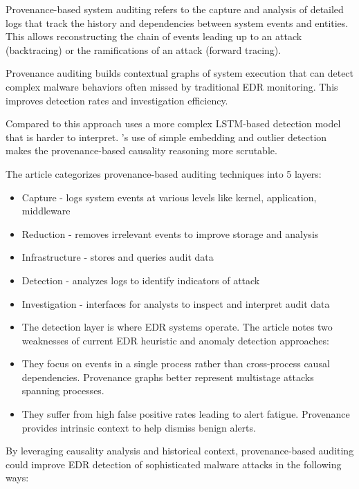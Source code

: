 \documentclass{article}
\begin{document}
Provenance-based system auditing refers to the capture and analysis of detailed logs that track the history and dependencies between system events and entities. This allows reconstructing the chain of events leading up to an attack (backtracing) or the ramifications of an attack (forward tracing).

Provenance auditing builds contextual graphs of system execution that can detect complex malware behaviors often missed by traditional EDR monitoring. This improves detection rates and investigation efficiency.

Compared to \autocite{Wang:2020} this approach uses a more complex LSTM-based detection model that is harder to interpret. \textcite{Wang:2020}'s use of simple embedding and outlier detection makes the provenance-based causality reasoning more scrutable.


The article categorizes provenance-based auditing techniques into 5 layers:

\begin{itemize}
\item Capture - logs system events at various levels like kernel, application, middleware
\item Reduction - removes irrelevant events to improve storage and analysis
\item Infrastructure - stores and queries audit data
\item Detection - analyzes logs to identify indicators of attack
\item Investigation - interfaces for analysts to inspect and interpret audit data
\item The detection layer is where EDR systems operate. The article notes two weaknesses of current EDR heuristic and anomaly detection approaches:
\end{itemize}

\begin{itemize}
\item They focus on events in a single process rather than cross-process causal dependencies. Provenance graphs better represent multistage attacks spanning processes.
\item They suffer from high false positive rates leading to alert fatigue. Provenance provides intrinsic context to help dismiss benign alerts.
\end{itemize}

By leveraging causality analysis and historical context, provenance-based auditing could improve EDR detection of sophisticated malware attacks in the following ways:
\end{document}

